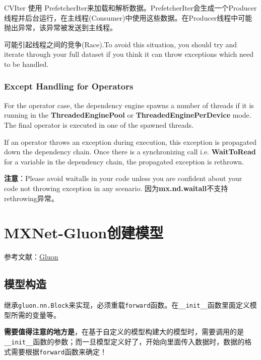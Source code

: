 CVIter 使用 PrefetcherIter来加载和解析数据。PrefetcherIter会生成一个Producer线程并后台运行，在主线程(Consumer)中使用这些数据。在Producer线程中可能抛出异常，该异常被发送到主线程。


可能引起线程之间的竞争(Race).To avoid this situation, you should try and iterate through your full dataset if you think it can throw exceptions which need to be handled.

\subsubsection{Except Handling for Operators}

For the operator case, the dependency engine spawns a number of threads if it is running in the \textbf{ThreadedEnginePool} or \textbf{ThreadedEnginePerDevice} mode. The final operator is executed in one of the spawned threads.

If an operator throws an exception during execution, this exception is propagated down the dependency chain. Once there is a synchronizing call i.e. \textbf{WaitToRead} for a variable in the dependency chain, the propagated exception is rethrown.


\textbf{注意}：Please avoid waitalls in your code unless you are confident about your code not throwing exception in any scenario. 因为\textbf{mx.nd.waitall}不支持rethrowing异常。

\section{MXNet-Gluon创建模型}

参考文献：\href{zh.gluon.ai}{Gluon}

\subsection{模型构造}

继承\verb|gluon.nn.Block|来实现，必须重载\verb|forward|函数。在\verb|__init__|函数里面定义模型所需的变量等。

\textbf{需要值得注意的地方是}，在基于自定义的模型构建大的模型时，需要调用的是\verb|__init__|函数的参数；而一旦模型定义好了，开始向里面传入数据时，数据的格式需要根据\verb|forward|函数来确定！

